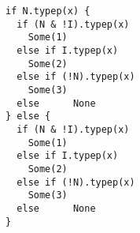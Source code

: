 \begin{lstlisting}[style=scalaioScala]
if N.typep(x) {
  if (N & !I).typep(x)
    Some(1)
  else if I.typep(x)
    Some(2)
  else if (!N).typep(x)
    Some(3)
  else      None
} else {
  if (N & !I).typep(x)
    Some(1)
  else if I.typep(x)
    Some(2)
  else if (!N).typep(x)
    Some(3)
  else      None
}
\end{lstlisting}
